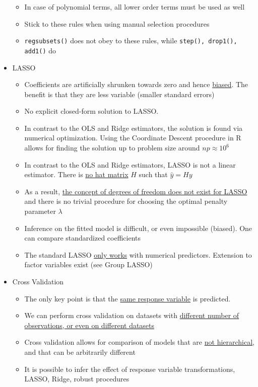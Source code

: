 \documentclass[a4paper]{article}
\begin{document}
\begin{itemize}
\begin{itemize}
        \item In case of polynomial terms, all lower order terms must be used as well
        \item Stick to these rules when using manual selection procedures
        \item \texttt{regsubsets()} does not obey to these rules, while \texttt{step(), drop1(), add1()} do
    \end{itemize}
    \item LASSO
    \begin{itemize}
        \item Coefficients are artificially shrunken towards zero and hence \underline{biased}. The benefit is that they are less variable (smaller standard errors)
        \item No explicit closed-form solution to LASSO.
        \item In contrast to the OLS and Ridge estimators, the solution is found via numerical optimization. Using the Coordinate Descent procedure in R allows for finding the solution up to problem size around $np\approx10^6$
        \item In contrast to the OLS and Ridge estimators, LASSO is not a linear estimator. There is \underline{no hat matrix} $H$ such that $\hat{y}=Hy$
        \item As a result, \underline{the concept of degrees of freedom does not exist for LASSO} and there is no trivial procedure for choosing the optimal penalty parameter $\lambda$ 
        \item Inference on the fitted model is difficult, or even impossible (biased). One can compare standardized coefficients
        \item The standard LASSO \underline{only works} with numerical predictors. Extension to factor variables exist (see Group LASSO)
    \end{itemize}
    \item Cross Validation
    \begin{itemize}
        \item The only key point is that the \underline{same response variable} is predicted.
        \item We can perform cross validation on datasets with \underline{different number of observations, or even on different datasets}
        \item Cross validation allows for comparison of models that are \underline{not hierarchical}, and that can be arbitrarily different
        \item It is possible to infer the effect of response variable transformations, LASSO, Ridge, robust procedures

\end{itemize}
\end{itemize}
\end{document}
